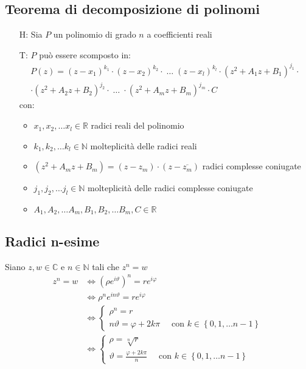\documentclass[a4paper]{article}
\begin{document}
\subsection{Teorema di decomposizione di polinomi}
\begin{itemize}
	\item[H:] Sia \(P\) un polinomio di grado \(n\) a coefficienti reali
	\item[T:] \(P\) può essere scomposto in:
	\begin{multline*}
		P(z) = \left( z - x_1 \right) ^ {k_1} \cdot \left( z - x_2 \right) ^ {k_2} \cdot \; \dots \; \left( z - x_l \right) ^ {k_l} \cdot \left( z^2 + A_1 z + B_1 \right) ^ {j_1} \cdot \\
		\cdot \left( z^2 + A_2 z + B_2 \right) ^ {j_2} \cdot \; \dots \; \cdot \left( z^2 + A_m z + B_m \right) ^ {j_m} \cdot  C
	\end{multline*}
	con:
	\begin{itemize}
		\item \(x_1, x_2, \dots x_l \in \mathbb{R}\) radici reali del polinomio
		\item \(k_1, k_2, \dots k_l \in \mathbb{N}\) molteplicità delle radici reali
		\item \(\left( z^2 + A_m z + B_m \right) = \left( z - z_m \right) \cdot \left( z - \overline{z_m} \right)\) radici complesse coniugate
		\item \(j_1, j_2, \dots j_l \in \mathbb{N}\) molteplicità delle radici complesse coniugate
		\item \(A_1, A_2, \dots A_m, B_1, B_2, \dots B_m, C \in \mathbb{R}\)
	\end{itemize}
\end{itemize}

\subsection{Radici n-esime}
Siano \(z, w \in \mathbb{C}\) e \(n \in \mathbb{N}\) tali che \(z ^ n = w\)
\begin{align*}
	z ^ n = w &\Leftrightarrow \left( \rho e ^ {i \vartheta} \right) ^ n = r e ^ {i \varphi} \\
	&\Leftrightarrow \rho ^ n e ^ {i n \vartheta} = r e ^ {i \varphi} \\
	&\Leftrightarrow
	\begin{cases}
		\rho ^ n = r \\
		n \vartheta = \varphi + 2 k \pi \quad \text{ con } k \in \left\{ 0, 1, \dots n-1 \right\}
	\end{cases} \\
	&\Leftrightarrow
	\begin{cases}
		\rho = \sqrt[n]{r} \\
		\vartheta = \frac{\varphi + 2k\pi}{n} \quad \text{ con } k \in \left\{ 0, 1, \dots n-1 \right\}
	\end{cases}
\end{align*}
\end{document}
